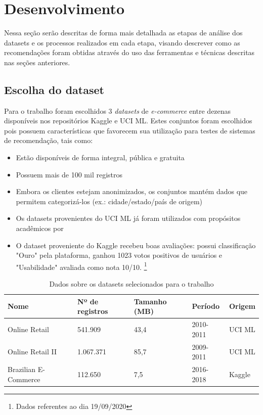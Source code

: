 \chapter{Desenvolvimento} \label{desenv}
\pagestyle{simple} 

Nessa seção serão descritas de forma mais detalhada as etapas de análise dos datasets e os processos realizados em cada etapa, visando descrever como as recomendações foram obtidas através do uso das ferramentas e técnicas descritas nas seções anteriores.

\section{Escolha do dataset} \label{escolha-ds}

Para o trabalho foram escolhidos 3 \textit{datasets} de \textit{e-commerce} entre dezenas disponíveis nos repositórios Kaggle e UCI ML. Estes conjuntos foram escolhidos pois possuem características que favorecem sua utilização para testes de sistemas de recomendação, tais como:

\begin{itemize}
    \item Estão disponíveis de forma integral, pública e gratuita
    \item Possuem mais de 100 mil registros
    \item Embora os clientes estejam anonimizados, os conjuntos mantém dados que permitem categorizá-los (ex.: cidade/estado/país de origem)
    \item Os datasets provenientes do UCI ML já foram utilizados com propósitos acadêmicos por 
    \item O dataset proveniente do Kaggle recebeu boas avaliações: possui classificação "Ouro" pela plataforma, ganhou 1023 votos positivos de usuários e "Usabilidade" avaliada como nota 10/10. \footnote{Dados referentes ao dia 19/09/2020}
\end{itemize}

\begin{table}[ht]
\centering
\begin{tabular}{@{}lllll@{}}
\toprule
\textbf{Nome}        & \textbf{Nº de registros} & \textbf{Tamanho (MB)} & \textbf{Período} & \textbf{Origem} \\ \midrule
Online Retail        & 541.909                  & 43,4                  & 2010-2011        & UCI ML             \\
Online Retail II     & 1.067.371                & 85,7                  & 2009-2011        & UCI ML            \\
Brazilian E-Commerce & 112.650                   & 7,5                  & 2016-2018        & Kaggle          \\ \bottomrule
\end{tabular}
\caption{Dados sobre os datasets selecionados para o trabalho}
\label{tab:my-table}
\end{table}

